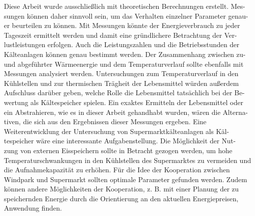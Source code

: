 Diese Arbeit wurde ausschließlich mit theoretischen Berechnungen erstellt. Mes-
sungen können daher sinnvoll sein, um das Verhalten einzelner Parameter genau-
er beurteilen zu können. Mit Messungen könnte der Energieverbrauch zu jeder
Tageszeit ermittelt werden und damit eine gründlichere Betrachtung der Ver-
lustleistungen erfolgen. Auch die Leistungszahlen und die Betriebsstunden der
Kälteanlagen können genau bestimmt werden. Der Zusammenhang zwischen zu-
und abgeführter Wärmeenergie und dem Temperaturverlauf sollte ebenfalls mit
Messungen analysiert werden. Untersuchungen zum Temperaturverlauf in den
Kühlstellen und zur thermischen Trägheit der Lebensmittel würden außerdem
Aufschluss darüber geben, welche Rolle die Lebensmittel tatsächlich bei der Be-
wertung als Kältespeicher spielen. Ein exaktes Ermitteln der Lebensmittel oder
ein Abstrahieren, wie es in dieser Arbeit gehandhabt wurden, wären die Alterna-
tiven, die sich aus den Ergebnissen dieser Messungen ergeben.
Eine Weiterentwicklung der Untersuchung von Supermarktkälteanlagen als Käl-
tespeicher wäre eine interessante Aufgabenstellung. Die Möglichkeit der Nut-
zung von externen Eisspeichern sollte in Betracht gezogen werden, um hohe
Temperaturschwankungen in den Kühlstellen des Supermarktes zu vermeiden
und die Aufnahmekapazität zu erhöhen. Für die Idee der Kooperation zwischen
Windpark und Supermarkt sollten optimale Parameter gefunden werden. Zudem
können andere Möglichkeiten der Kooperation, z. B. mit einer Planung der zu
speichernden Energie durch die Orientierung an den aktuellen Energiepreisen,
Anwendung finden.

